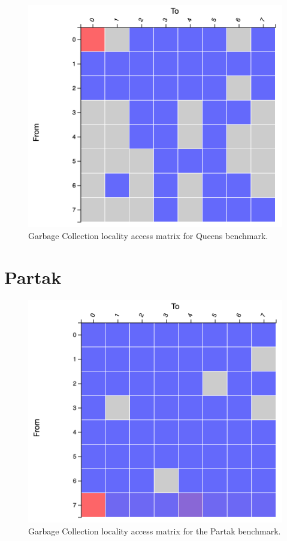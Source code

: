 \documentclass[a4paper,11pt]{article}
\begin{document}
\begin{figure}[!htb]
    \centering
    \includegraphics[width=0.6\linewidth]{TechMemo/gc/images/queens_gc.png}
    \caption{Garbage Collection locality access matrix for Queens benchmark.}
    \label{fig:my_label}
\end{figure}

\section{Partak}

\begin{table}[!htb]
  \centering
  \caption{Garbage Collection frequencies per region and per generation.}
  \label{table:baseline}
\end{table}

\begin{figure}[!htb]
    \centering
    \includegraphics[width=0.6\linewidth]{TechMemo/gc/images/partak_gc.png}
    \caption{Garbage Collection locality access matrix for the Partak benchmark.}
    \label{fig:my_label}
\end{figure}
\end{document}
